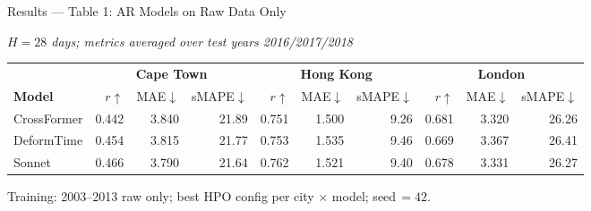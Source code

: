 \documentclass[aspectratio=169,10pt]{beamer}
\begin{document}
\begin{frame}{Results --- Table 1: AR Models on Raw Data Only}
  \vspace{-0.2em}
  \begin{center}
    {\small\textit{$H=28$ days; metrics averaged over test years 2016/2017/2018}}
  \end{center}
  \vspace{0.1em}
  \begin{table}
    \centering
    \footnotesize
    \setlength{\tabcolsep}{6pt}
    \begin{tabular}{l rrr rrr rrr}
      \toprule
      & \multicolumn{3}{c}{\textbf{Cape Town}}
      & \multicolumn{3}{c}{\textbf{Hong Kong}}
      & \multicolumn{3}{c}{\textbf{London}} \\
      \cmidrule(lr){2-4}\cmidrule(lr){5-7}\cmidrule(lr){8-10}
      \textbf{Model}
        & $r{\uparrow}$ & MAE${\downarrow}$ & sMAPE${\downarrow}$
        & $r{\uparrow}$ & MAE${\downarrow}$ & sMAPE${\downarrow}$
        & $r{\uparrow}$ & MAE${\downarrow}$ & sMAPE${\downarrow}$ \\
      \midrule
      CrossFormer
        & 0.442 & 3.840 & 21.89
        & 0.751 & 1.500 &  9.26
        & 0.681 & 3.320 & 26.26 \\
      DeformTime
        & 0.454 & 3.815 & 21.77
        & 0.753 & 1.535 &  9.46
        & 0.669 & 3.367 & 26.41 \\
      Sonnet
        & 0.466 & 3.790 & 21.64
        & 0.762 & 1.521 &  9.40
        & 0.678 & 3.331 & 26.27 \\
      \bottomrule
    \end{tabular}
  \end{table}
  \vspace{0.2em}
  {\footnotesize Training: 2003--2013 raw only;\;
   best HPO config per city $\times$ model;\; seed\,$=42$.}
\end{frame}
\end{document}
